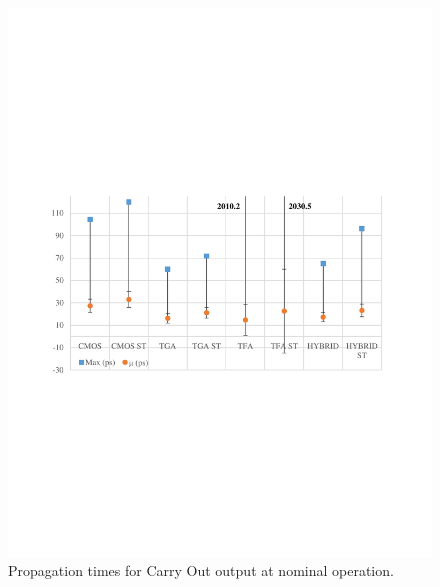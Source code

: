\documentclass[ecp,tc, english]{iiufrgs}
\begin{document}
\begin{figure}[H]
\centering
\includegraphics[width=\textwidth, trim={0 9cm 0 9cm},clip]{delaysNominalCarryOut.pdf}
\caption{Propagation times for Carry Out output at nominal operation.}
\label{fig:Fig44}
\end{figure}
\end{document}
